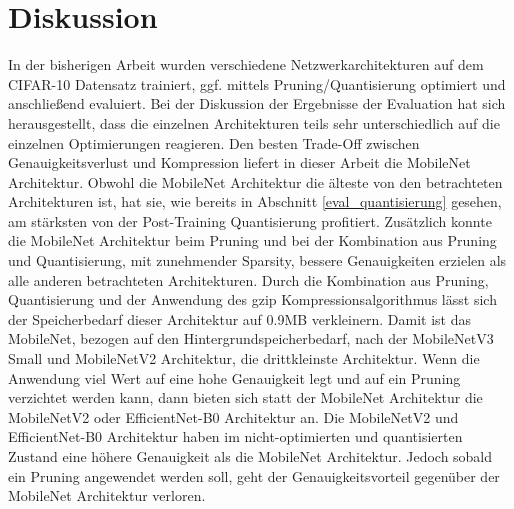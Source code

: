 \section{Diskussion}
In der bisherigen Arbeit wurden verschiedene Netzwerkarchitekturen auf dem CIFAR-10 Datensatz trainiert, ggf. mittels Pruning/Quantisierung optimiert und anschließend evaluiert. Bei der Diskussion der Ergebnisse der Evaluation hat sich herausgestellt, dass die einzelnen Architekturen teils sehr unterschiedlich auf die einzelnen Optimierungen reagieren. Den besten Trade-Off zwischen Genauigkeitsverlust und Kompression liefert in dieser Arbeit die MobileNet Architektur. Obwohl die MobileNet Architektur die älteste von den betrachteten Architekturen ist, hat sie, wie bereits in Abschnitt \ref{eval_quantisierung} gesehen, am stärksten von der Post-Training Quantisierung profitiert. Zusätzlich konnte die MobileNet Architektur beim Pruning und bei der Kombination aus Pruning und Quantisierung, mit zunehmender Sparsity, bessere Genauigkeiten erzielen als alle anderen betrachteten Architekturen. Durch die Kombination aus Pruning, Quantisierung und der Anwendung des gzip Kompressionsalgorithmus lässt sich der Speicherbedarf dieser Architektur auf 0.9MB verkleinern. Damit ist das MobileNet, bezogen auf den Hintergrundspeicherbedarf, nach der MobileNetV3 Small und MobileNetV2 Architektur, die drittkleinste Architektur. Wenn die Anwendung viel Wert auf eine hohe Genauigkeit legt und auf ein Pruning verzichtet werden kann, dann bieten sich statt der MobileNet Architektur die MobileNetV2 oder EfficientNet-B0 Architektur an. Die MobileNetV2 und EfficientNet-B0 Architektur haben im nicht-optimierten und quantisierten Zustand eine höhere Genauigkeit als die MobileNet Architektur. Jedoch sobald ein Pruning angewendet werden soll, geht der Genauigkeitsvorteil gegenüber der MobileNet Architektur verloren.
